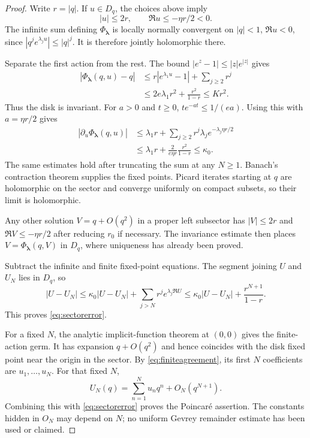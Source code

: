 \documentclass[11pt,a4paper]{article}
\numberwithin{equation}{section}
\theoremstyle{definition}
\theoremstyle{remark}
\newcommand{\lam}{\boldsymbol\lambda}
\newcommand{\PhiL}{\Phi_{\lam}}
\begin{document}
\begin{proof}
Write $r=|q|$.  If $u\in D_q$, the choices above imply
\[
 |u|\le2r,\qquad \Re u\le-\eta r/2<0.
\]
The infinite sum defining $\PhiL$ is locally normally convergent on
$|q|<1$, $\Re u<0$, since $|q^je^{\lambda_ju}|\le|q|^j$.
It is therefore jointly holomorphic there.

Separate the first action from the rest.  The bound
$|e^z-1|\le|z|e^{|z|}$ gives
\begin{align*}
 |\PhiL(q,u)-q|
 &\le r|e^{\lambda_1u}-1|+\sum_{j\ge2}r^j
 \\
 &\le2e\lambda_1r^2+\frac{r^2}{1-r}
 \le Kr^2.
\end{align*}
Thus the disk is invariant.  For $a>0$ and $t\ge0$,
$t e^{-at}\le1/(ea)$.  Using this with $a=\eta r/2$ gives
\begin{align*}
 |\partial_u\PhiL(q,u)|
 &\le\lambda_1r+
       \sum_{j\ge2}r^j\lambda_j e^{-\lambda_j\eta r/2}
 \\
 &\le\lambda_1r+
       \frac{2}{e\eta r}\frac{r^2}{1-r}
 \le\kappa_0.
\end{align*}
The same estimates hold after truncating the sum at any $N\ge1$.
Banach's contraction theorem supplies the fixed points.  Picard iterates
starting at $q$ are holomorphic on the sector and converge uniformly on
compact subsets, so their limit is holomorphic.

Any other solution $V=q+O(q^2)$ in a proper left subsector has
$|V|\le2r$ and $\Re V\le-\eta r/2$ after reducing $r_0$ if necessary.
The invariance estimate then places $V=\PhiL(q,V)$ in $D_q$, where
uniqueness has already been proved.

Subtract the infinite and finite fixed-point equations.  The segment
joining $U$ and $U_N$ lies in $D_q$, so
\[
 |U-U_N|\le\kappa_0|U-U_N|+
       \sum_{j>N}r^j e^{\lambda_j\Re U}
 \le\kappa_0|U-U_N|+\frac{r^{N+1}}{1-r}.
\]
This proves \eqref{eq:sectorerror}.

For a fixed $N$, the analytic implicit-function theorem at $(0,0)$ gives
the finite-action germ.  It has expansion $q+O(q^2)$ and hence coincides
with the disk fixed point near the origin in the sector.  By
\eqref{eq:finiteagreement}, its first $N$ coefficients are $u_1,\ldots,u_N$.
For that fixed $N$,
\[
 U_N(q)=\sum_{n=1}^Nu_nq^n+O_N(q^{N+1}).
\]
Combining this with \eqref{eq:sectorerror} proves the Poincar\'e assertion.
The constants hidden in $O_N$ may depend on $N$; no uniform Gevrey
remainder estimate has been used or claimed.
\end{proof}
\end{document}
